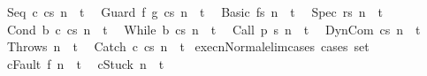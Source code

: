 \begin{isabellebody}
\ \ {\isachardoublequoteopen}{\isasymGamma}{\isasymturnstile}{\isasymlangle}Seq\ c{}\ c{}{\isacharcomma}s{\isasymrangle}\ {\isacharequal}n{\isasymRightarrow}\ \ t{\isachardoublequoteclose}\isanewline
\ \ {\isachardoublequoteopen}{\isasymGamma}{\isasymturnstile}{\isasymlangle}Guard\ f\ g\ c{\isacharcomma}s{\isasymrangle}\ {\isacharequal}n{\isasymRightarrow}\ \ t{\isachardoublequoteclose}\isanewline
\ \ {\isachardoublequoteopen}{\isasymGamma}{\isasymturnstile}{\isasymlangle}Basic\ f{\isacharcomma}s{\isasymrangle}\ {\isacharequal}n{\isasymRightarrow}\ \ t{\isachardoublequoteclose}\isanewline
\ \ {\isachardoublequoteopen}{\isasymGamma}{\isasymturnstile}{\isasymlangle}Spec\ r{\isacharcomma}s{\isasymrangle}\ {\isacharequal}n{\isasymRightarrow}\ \ t{\isachardoublequoteclose}\isanewline
\ \ {\isachardoublequoteopen}{\isasymGamma}{\isasymturnstile}{\isasymlangle}Cond\ b\ c{}\ c{}{\isacharcomma}s{\isasymrangle}\ {\isacharequal}n{\isasymRightarrow}\ \ t{\isachardoublequoteclose}\isanewline
\ \ {\isachardoublequoteopen}{\isasymGamma}{\isasymturnstile}{\isasymlangle}While\ b\ c{\isacharcomma}s{\isasymrangle}\ {\isacharequal}n{\isasymRightarrow}\ \ t{\isachardoublequoteclose}\isanewline
\ \ {\isachardoublequoteopen}{\isasymGamma}{\isasymturnstile}{\isasymlangle}Call\ p\ {\isacharcomma}s{\isasymrangle}\ {\isacharequal}n{\isasymRightarrow}\ \ t{\isachardoublequoteclose}\isanewline
\ \ {\isachardoublequoteopen}{\isasymGamma}{\isasymturnstile}{\isasymlangle}DynCom\ c{\isacharcomma}s{\isasymrangle}\ {\isacharequal}n{\isasymRightarrow}\ \ t{\isachardoublequoteclose}\isanewline
\ \ {\isachardoublequoteopen}{\isasymGamma}{\isasymturnstile}{\isasymlangle}Throw{\isacharcomma}s{\isasymrangle}\ {\isacharequal}n{\isasymRightarrow}\ \ t{\isachardoublequoteclose}\isanewline
\ \ {\isachardoublequoteopen}{\isasymGamma}{\isasymturnstile}{\isasymlangle}Catch\ c{}\ c{}{\isacharcomma}s{\isasymrangle}\ {\isacharequal}n{\isasymRightarrow}\ \ t{\isachardoublequoteclose}\isanewline
\isanewline
\isanewline
{}\isamarkupfalse%
\ execn{\isacharunderscore}Normal{\isacharunderscore}elim{\isacharunderscore}cases\ {\isacharbrackleft}cases\ set{\isacharbrackright}{\isacharcolon}\ \isanewline
\ \ {\isachardoublequoteopen}{\isasymGamma}{\isasymturnstile}{\isasymlangle}c{\isacharcomma}Fault\ f{\isasymrangle}\ {\isacharequal}n{\isasymRightarrow}\ \ t{\isachardoublequoteclose}\isanewline
\ \ {\isachardoublequoteopen}{\isasymGamma}{\isasymturnstile}{\isasymlangle}c{\isacharcomma}Stuck{\isasymrangle}\ {\isacharequal}n{\isasymRightarrow}\ \ t{\isachardoublequoteclose}\isanewline

\end{isabellebody}
